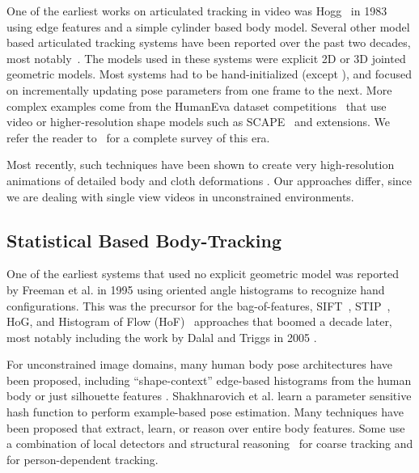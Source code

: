 One of the earliest works on articulated tracking in video was Hogg~\cite{hogg1983model} in 1983 using edge features and a simple cylinder based body model.  Several other model based articulated tracking systems have been reported over the past two decades, most notably~\cite{rehg1995model, kakadiaris1996model, wren1997pfinder, bregler1998tracking, deutscher2000articulated, sidenbladh2000stochastic, sminchisescu2001covariance}. The models used in these systems were explicit 2D or 3D jointed geometric models.  Most systems had to be hand-initialized (except \cite{wren1997pfinder}), and focused on incrementally updating pose parameters from one frame to the next. More complex examples come from the HumanEva dataset competitions~\cite{Sigal2010} that use video or higher-resolution shape models such as SCAPE~\cite{anguelov2005scape} and extensions. We refer the reader to~\cite{poppe2007vision} for a complete survey of this era.   

Most recently, such techniques have been shown to create very high-resolution animations of detailed body and cloth deformations \cite{de2008performance,jain2010moviereshape,stoll2011fast}.  Our approaches differ, since we are dealing with single view videos in unconstrained environments.

\subsection*{Statistical Based Body-Tracking}

One of the earliest systems that used no explicit geometric model was reported by Freeman et al. in 1995 \cite{freeman1995orientation} using oriented angle histograms to recognize hand configurations.  This was the precursor for the bag-of-features, SIFT~\cite{SIFT}, STIP~\cite{STIP}, HoG, and Histogram of Flow (HoF)~\cite{dalal2006human} approaches that boomed a decade later, most notably including the work by Dalal and Triggs in 2005 \cite{Dalal2005}.

For unconstrained image domains, many human body pose architectures have been proposed, including ``shape-context'' edge-based histograms from the human body \cite{mori2002estimating, agarwal2006recovering} or just silhouette features \cite{Grauman2003}.  Shakhnarovich et al. \cite{Shakhnarovich03fastpose} learn a parameter sensitive hash function to perform example-based pose estimation.  Many techniques have been proposed that extract, learn, or reason over entire body features.  Some use a combination of local detectors and structural reasoning~\cite{ramanan2005strike} for coarse tracking and \cite{buehler2009learning} for person-dependent tracking. 

